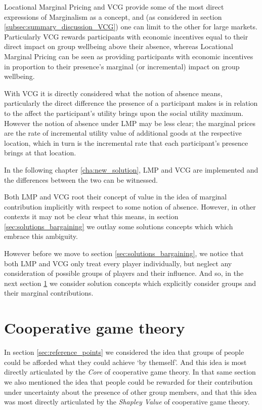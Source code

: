 Locational Marginal Pricing and VCG provide some of the most direct expressions of Marginalism as a concept, and (as considered in section \ref{subsec:summary_discussion_VCG}) one can limit to the other for large markets.
Particularly VCG rewards participants with economic incentives equal to their direct impact on group wellbeing above their absence, whereas Locational Marginal Pricing can be seen as providing participants with economic incentives in proportion to their presence's marginal (or incremental) impact on group wellbeing.

With VCG it is directly considered what the notion of absence means, particularly the direct difference the presence of a participant makes is in relation to the affect the participant's utility brings upon the social utility maximum.
However the notion of absence under LMP may be less clear; the marginal prices are the rate of incremental utility value of additional goods at the respective location, which in turn is the incremental rate that each participant's presence brings at that location.

In the following chapter \ref{cha:new_solution}, LMP and VCG are implemented and the differences between the two can be witnessed.

Both LMP and VCG root their concept of value in the idea of marginal contribution implicitly with respect to some notion of absence. However, in other contexts it may not be clear what this means, in section \ref{sec:solutions_bargaining} we outlay some solutions concepts which which embrace this ambiguity.

However before we move to section \ref{sec:solutions_bargaining}, we notice that both LMP and VCG only treat every player individually, but neglect any consideration of possible groups of players and their influence.
And so, in the next section \ref{sec:cooperative_game_theory_part} we consider solution concepts which explicitly consider groups and their marginal contributions.



\section{Cooperative game theory}\label{sec:cooperative_game_theory_part}

In section \ref{sec:reference_points} we considered the idea that groups of people could be afforded what they could achieve `by themself'.
And this idea is most directly articulated by the \textit{Core} of cooperative game theory.
In that same section we also mentioned the idea that people could be rewarded for their contribution under uncertainty about the presence of other group members, and that this idea was most directly articulated by the \textit{Shapley Value} of cooperative game theory.

